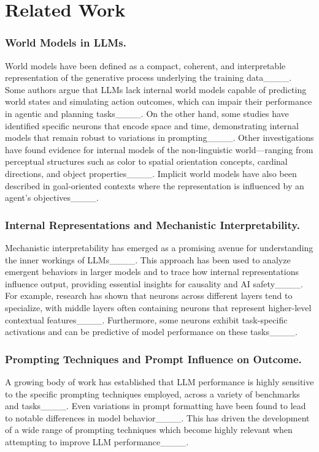 \section{Related Work}
\subsubsection{World Models in LLMs.} World models have been defined as a compact, coherent, and interpretable representation of the generative process underlying the training data____. Some authors argue that LLMs lack internal world models capable of predicting world states and simulating action outcomes, which can impair their performance in agentic and planning tasks____. On the other hand, some studies have identified specific neurons that encode space and time, demonstrating internal models that remain robust to variations in prompting____. Other investigations have found evidence for internal models of the non-linguistic world—ranging from perceptual structures such as color to spatial orientation concepts, cardinal directions, and object properties____. Implicit world models have also been described in goal-oriented contexts where the representation is influenced by an agent’s objectives____.

\subsubsection{Internal Representations and Mechanistic Interpretability.} Mechanistic interpretability has emerged as a promising avenue for understanding the inner workings of LLMs____. This approach has been used to analyze emergent behaviors in larger models and to trace how internal representations influence output, providing essential insights for causality and AI safety____. For example, research has shown that neurons across different layers tend to specialize, with middle layers often containing neurons that represent higher-level contextual features____. Furthermore, some neurons exhibit task-specific activations and can be predictive of model performance on these tasks____.

\subsubsection{Prompting Techniques and Prompt Influence on Outcome.} A growing body of work has established that LLM performance is highly sensitive to the specific prompting techniques employed, across a variety of benchmarks and tasks____. Even variations in prompt formatting have been found to lead to notable differences in model behavior____. This has driven the development of a wide range of prompting techniques which become highly relevant when attempting to improve LLM performance____.

